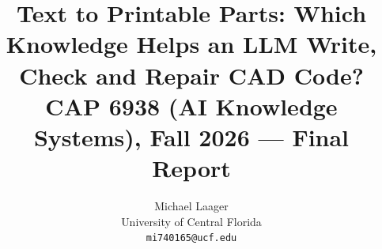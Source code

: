 \documentclass[10pt,twocolumn,letterpaper]{article}
\title{Text to Printable Parts: Which Knowledge Helps an LLM Write, Check and Repair CAD Code?\\
{\large CAP 6938 (AI Knowledge Systems), Fall 2026 --- Final Report}}
\author{Michael Laager\\
University of Central Florida\\
{\tt\small mi740165@ucf.edu}
}
\begin{document}
\maketitle









{
    \small
    
    
}

\clearpage
\appendix

\end{document}
